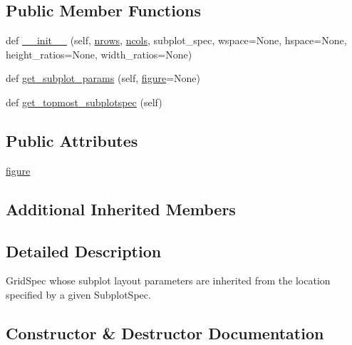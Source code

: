 \subsection*{Public Member Functions}
\begin{DoxyCompactItemize}
\item 
def \hyperlink{classmatplotlib_1_1gridspec_1_1GridSpecFromSubplotSpec_a1ecf3846952be3c63fdd34b0b8235176}{\+\_\+\+\_\+init\+\_\+\+\_\+} (self, \hyperlink{classmatplotlib_1_1gridspec_1_1GridSpecBase_a610c62c29d638e1ed969419091c97f74}{nrows}, \hyperlink{classmatplotlib_1_1gridspec_1_1GridSpecBase_ad86cfae5903f2bf4e2fc878fd39461f3}{ncols}, subplot\+\_\+spec, wspace=None, hspace=None, height\+\_\+ratios=None, width\+\_\+ratios=None)
\item 
def \hyperlink{classmatplotlib_1_1gridspec_1_1GridSpecFromSubplotSpec_aa1abb3a93ddd58db397865f95143e368}{get\+\_\+subplot\+\_\+params} (self, \hyperlink{classmatplotlib_1_1gridspec_1_1GridSpecFromSubplotSpec_aeb52c0ce6361ec58309418d2e4000664}{figure}=None)
\item 
def \hyperlink{classmatplotlib_1_1gridspec_1_1GridSpecFromSubplotSpec_af51cb71e5874185da36d693d6b126926}{get\+\_\+topmost\+\_\+subplotspec} (self)
\end{DoxyCompactItemize}
\subsection*{Public Attributes}
\begin{DoxyCompactItemize}
\item 
\hyperlink{classmatplotlib_1_1gridspec_1_1GridSpecFromSubplotSpec_aeb52c0ce6361ec58309418d2e4000664}{figure}
\end{DoxyCompactItemize}
\subsection*{Additional Inherited Members}


\subsection{Detailed Description}
\begin{DoxyVerb}GridSpec whose subplot layout parameters are inherited from the
location specified by a given SubplotSpec.
\end{DoxyVerb}
 

\subsection{Constructor \& Destructor Documentation}
\mbox{\label{classmatplotlib_1_1gridspec_1_1GridSpecFromSubplotSpec_a1ecf3846952be3c63fdd34b0b8235176}} 
